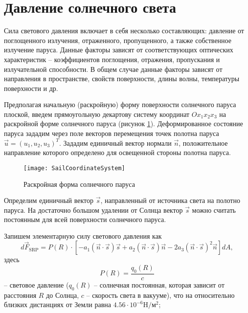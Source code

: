 \section{Давление солнечного света}
\noindent\indent Сила светового давления включает в себя несколько составляющих:
давление от поглощенного излучения, отраженного, пропущенного, а также собственное
излучение паруса. Данные факторы зависят от соответствующих оптических характеристик --
коэффициентов поглощения, отражения, пропускания и излучательной способности. В
общем случае данные факторы зависят от направления в пространстве, свойств поверхности,
длины волны, температуры поверхности и др.\par
  Предполагая начальную (раскройную) форму поверхности солнечного паруса плоской,
введем прямоугольную декартову систему координат $Ox_1x_2x_3$ на раскройной форме
солнечного паруса (рисунок \ref{fig:SailCoordinateSystem}). Деформированное состояние
паруса зададим через поле векторов перемещения точек полотна паруса
$\vec{u} = (u_1, u_2, u_3)^T$. Зададим единичный вектор нормали $\vec{n}$,
положительное направление которого определено для освещенной стороны полотна паруса.
\begin{figure}[h]
  \centering
  \texttt{[image: SailCoordinateSystem]}
  \caption{Раскройная форма солнечного паруса}
  \label{fig:SailCoordinateSystem}
\end{figure}
Определим единичный вектор $\vec{s}$, направленный от источника света на полотно
паруса. На достаточно большом удалении от Солнца вектор $\vec{s}$ можно считать
постоянным для всей поверхности солнечного паруса.\par
  Запишем элементарную силу светового давления как
\begin{equation}
  d\vec{F}_{\text{SRP}} = P(R) \cdot \left[
    -a_{1}(\vec{n}\cdot\vec{s})\vec{s}
    +a_{2}(\vec{n}\cdot\vec{s})\vec{n}
    -2a_{3}(\vec{n}\cdot\vec{s})^2\vec{n}
  \right]dA,
\end{equation}
здесь
\begin{equation}
  P(R) = \frac{q_0(R)}{c}
\end{equation}
-- световое давление ($q_0(R)$ -- солнечная постоянная, которая зависит от
расстояния $R$ до Солнца, $c$ -- скорость света в вакууме), что на относительно
близких дистанциях от Земли равна $4.56\cdot 10^{-6} \text{H}/\text{м}^2$;

